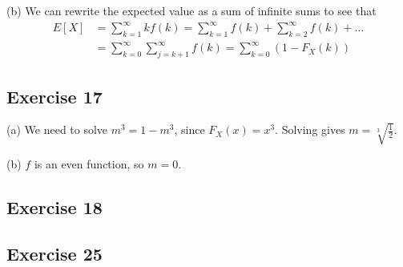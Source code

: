 (b) We can rewrite the expected value as a sum of infinite sums to see that
\begin{align*}
        E[X] &= \sum_{k = 1}^\infty k f(k) = \sum_{k = 1}^\infty f(k) + \sum_{k = 2}^\infty f(k) + ... \\
             &= \sum_{k = 0}^\infty \sum_{j = k + 1}^\infty f(k) = \sum_{k = 0}^\infty (1 - F_X(k))
\end{align*}

\subsection{Exercise 17}
(a) We need to solve $m^3 = 1 - m^3$, since $F_X(x) = x^3$. Solving gives $m = \sqrt[3]{\frac{1}{2}}$.

(b) $f$ is an even function, so $m = 0$.

\subsection{Exercise 18}

\subsection{Exercise 25}
